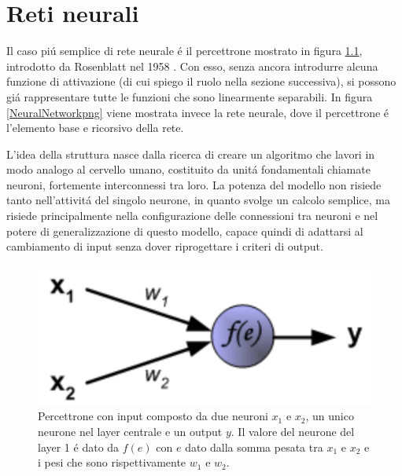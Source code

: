\documentclass[a4paper,12pt]{report}
\begin{document}
 
 
 \chapter{Reti neurali}  
 Il caso pi\'u semplice di rete neurale \'e il percettrone mostrato in figura \ref{perceptronpng}, introdotto da Rosenblatt nel 1958 \cite{rosenblatt1958perceptron}. 
 Con esso, senza ancora introdurre alcuna funzione di attivazione (di cui spiego il ruolo nella sezione successiva), si possono gi\'a rappresentare tutte le funzioni che sono linearmente separabili. 
 In figura \ref{NeuralNetworkpng} viene mostrata invece la rete neurale, dove il percettrone \'e l'elemento base e ricorsivo della rete. 
 
 L'idea della struttura nasce dalla ricerca di creare un algoritmo che lavori in modo analogo al cervello umano, costituito da unit\'a fondamentali chiamate neuroni, fortemente interconnessi tra loro. 
 La potenza del modello non risiede tanto nell'attivit\'a del singolo neurone, in quanto svolge un calcolo semplice, ma risiede principalmente nella configurazione delle connessioni tra neuroni e nel potere di generalizzazione di questo modello, capace quindi di adattarsi al cambiamento di input senza dover riprogettare i criteri di output.
 
 \begin{figure}[h!]
  \centering
  \includegraphics[scale=0.3]{perceptron.png}
  \caption{Percettrone con input composto da due neuroni $x_1$ e $x_2$, un unico neurone nel layer centrale e un output $y$. Il valore del neurone del layer 1 \'e dato da $f(e)$ con $e$ dato dalla somma pesata tra $x_1$ e $x_2$ e i pesi che sono rispettivamente $w_1$ e $w_2$.}
  \label{perceptronpng}
 \end{figure}
 
\end{document}
